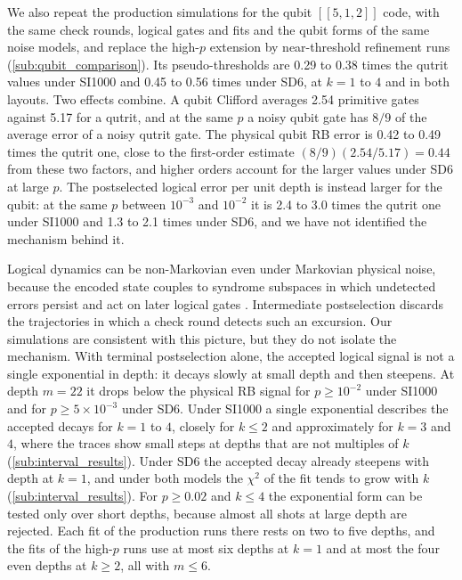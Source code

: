 We also repeat the production simulations for the qubit $[[5,1,2]]$ code, with the same check rounds, logical gates and fits and the qubit forms of the same noise models, and replace the high-$p$ extension by near-threshold refinement runs (\autoref{sub:qubit_comparison}). Its pseudo-thresholds are 0.29 to 0.38 times the qutrit values under SI1000 and 0.45 to 0.56 times under SD6, at $k = 1$ to $4$ and in both layouts. Two effects combine. A qubit Clifford averages 2.54 primitive gates against 5.17 for a qutrit, and at the same $p$ a noisy qubit gate has $8/9$ of the average error of a noisy qutrit gate. The physical qubit RB error is 0.42 to 0.49 times the qutrit one, close to the first-order estimate $(8/9)(2.54/5.17) = 0.44$ from these two factors, and higher orders account for the larger values under SD6 at large $p$. The postselected logical error per unit depth is instead larger for the qubit: at the same $p$ between $10^{-3}$ and $10^{-2}$ it is 2.4 to 3.0 times the qutrit one under SI1000 and 1.3 to 2.1 times under SD6, and we have not identified the mechanism behind it.

Logical dynamics can be non-Markovian even under Markovian physical noise, because the encoded state couples to syndrome subspaces in which undetected errors persist and act on later logical gates \cite{Ziyad2025}. Intermediate postselection discards the trajectories in which a check round detects such an excursion. Our simulations are consistent with this picture, but they do not isolate the mechanism. With terminal postselection alone, the accepted logical signal is not a single exponential in depth: it decays slowly at small depth and then steepens. At depth $m = 22$ it drops below the physical RB signal for $p \geq 10^{-2}$ under SI1000 and for $p \geq 5\times 10^{-3}$ under SD6. Under SI1000 a single exponential describes the accepted decays for $k = 1$ to $4$, closely for $k \le 2$ and approximately for $k = 3$ and $4$, where the traces show small steps at depths that are not multiples of $k$ (\autoref{sub:interval_results}). Under SD6 the accepted decay already steepens with depth at $k = 1$, and under both models the $\chi^2$ of the fit tends to grow with $k$ (\autoref{sub:interval_results}). For $p \geq 0.02$ and $k \le 4$ the exponential form can be tested only over short depths, because almost all shots at large depth are rejected. Each fit of the production runs there rests on two to five depths, and the fits of the high-$p$ runs use at most six depths at $k = 1$ and at most the four even depths at $k \ge 2$, all with $m \le 6$.